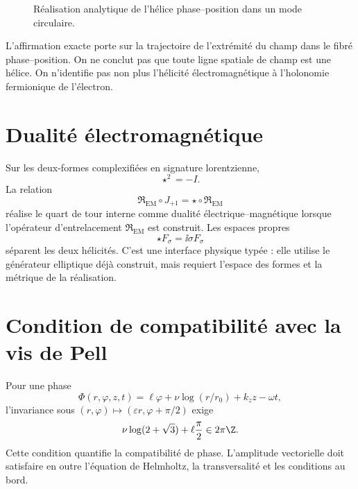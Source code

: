 \begin{figure}[htbp]
\centering
{}
\caption{Réalisation analytique de l'hélice phase--position dans un mode circulaire.}
\label{espiral:fig:helice-em}
\end{figure}

L'affirmation exacte porte sur la trajectoire de l'extrémité du champ dans le fibré phase--position. On ne conclut pas que toute ligne spatiale de champ est une hélice. On n'identifie pas non plus l'hélicité électromagnétique à l'holonomie fermionique de l'électron.

\section{Dualité électromagnétique}

Sur les deux-formes complexifiées en signature lorentzienne,
\[
 \star^2=-I.
\]
La relation
\[
 \mathfrak R_{\mathrm{EM}}\circ J_{+1}
 =\star\circ\mathfrak R_{\mathrm{EM}}
\]
réalise le quart de tour interne comme dualité électrique--magnétique lorsque l'opérateur d'entrelacement \(\mathfrak R_{\mathrm{EM}}\) est construit. Les espaces propres
\[
 \star F_\sigma=\ii\sigma F_\sigma
\]
séparent les deux hélicités. C'est une interface physique typée : elle utilise le générateur elliptique déjà construit, mais requiert l'espace des formes et la métrique de la réalisation.

\section{Condition de compatibilité avec la vis de Pell}

Pour une phase
\[
 \Phi(r,\varphi,z,t)
 =\ell\varphi+\nu\log(r/r_0)+k_zz-\omega t,
\]
l'invariance sous \((r,\varphi)\mapsto(\varepsilon r,\varphi+\pi/2)\) exige
\begin{equation}
 \nu\log(2+\sqrt3)+\ell\frac\pi2
 \in2\pi\Z.
 \label{espiral:eq:cuantizacion-tornillo-em}
\end{equation}
Cette condition quantifie la compatibilité de phase. L'amplitude vectorielle doit satisfaire en outre l'équation de Helmholtz, la transversalité et les conditions au bord.
